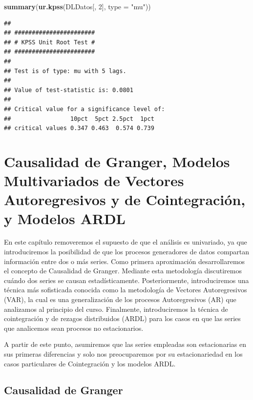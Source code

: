 \documentclass[
]{book}
\newenvironment{Shaded}{\begin{snugshade}}{\end{snugshade}}
\newcommand{\AttributeTok}[1]{\textcolor[rgb]{0.13,0.29,0.53}{#1}}
\newcommand{\DecValTok}[1]{\textcolor[rgb]{0.00,0.00,0.81}{#1}}
\newcommand{\FunctionTok}[1]{\textcolor[rgb]{0.13,0.29,0.53}{\textbf{#1}}}
\newcommand{\NormalTok}[1]{#1}
\newcommand{\StringTok}[1]{\textcolor[rgb]{0.31,0.60,0.02}{#1}}
\begin{document}
\begin{Shaded}
\begin{Highlighting}[]
\FunctionTok{summary}\NormalTok{(}\FunctionTok{ur.kpss}\NormalTok{(DLDatos[, }\DecValTok{2}\NormalTok{], }\AttributeTok{type =} \StringTok{"mu"}\NormalTok{))}
\end{Highlighting}
\end{Shaded}

\begin{verbatim}
## 
## ####################### 
## # KPSS Unit Root Test # 
## ####################### 
## 
## Test is of type: mu with 5 lags. 
## 
## Value of test-statistic is: 0.0801 
## 
## Critical value for a significance level of: 
##                 10pct  5pct 2.5pct  1pct
## critical values 0.347 0.463  0.574 0.739
\end{verbatim}

\hypertarget{causalidad-de-granger-modelos-multivariados-de-vectores-autoregresivos-y-de-cointegraciuxf3n-y-modelos-ardl}{%
\chapter{Causalidad de Granger, Modelos Multivariados de Vectores Autoregresivos y de Cointegración, y Modelos ARDL}\label{causalidad-de-granger-modelos-multivariados-de-vectores-autoregresivos-y-de-cointegraciuxf3n-y-modelos-ardl}}

En este capítulo removeremos el supuesto de que el análisis es univariado, ya que introduciremos la posibilidad de que los procesos generadores de datos compartan información entre dos o más series. Como primera aproximación desarrollaremos el concepto de Causalidad de Granger. Mediante esta metodología discutiremos cuándo dos series se causan estadísticamente. Posteriormente, introduciremos una técnica más sofisticada conocida como la metodología de Vectores Autoregresivos (VAR), la cual es una generalización de los procesos Autoregresivos (AR) que analizamos al principio del curso. Finalmente, introduciremos la técnica de cointegración y de rezagos distribuidos (ARDL) para los casos en que las series que analicemos sean procesos no estacionarios.

A partir de este punto, asumiremos que las series empleadas son estacionarias en sus primeras diferencias y solo nos preocuparemos por su estacionariedad en los casos particulares de Cointegración y los modelos ARDL.

\hypertarget{causalidad-de-granger}{%
\section{Causalidad de Granger}\label{causalidad-de-granger}}
\end{document}

